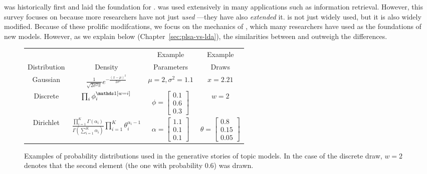\plsa{} was historically first and laid the foundation for .
\plsa{} was used extensively in many applications such as information
retrieval.  However, this survey focuses on  because more
researchers have not just \emph{used} ---they have also
\emph{extended} it.   is not just widely used, but it is also
widely modified.  Because of these prolific modifcations, we focus on the mechanics of , which many
researchers have used as the foundations of new models.  However, as
we explain below (Chapter~\ref{sec:plsa-vs-lda}), the similarities
between \plsa{} and  outweigh the differences.

\begin{figure}
\small
{}
  \begin{tabular}{cccc}
\hline
\rowcolor{gray!50}
 & & Example & Example \\
\rowcolor{gray!50}
    Distribution & Density & Parameters & Draws \\
    \hline \hline
    Gaussian  & $\frac{1}{\sqrt{2 \sigma^2 \pi}} e^{- \frac{(x-\mu)^2}{2 \sigma^2}}$ & $\mu=2, \sigma^2=1.1$ & $x=2.21$\\
    Discrete  & $\prod_i \phi_i^{\ind{w=i}}$ & $\phi=\begin{bmatrix}
           0.1 \\
           0.6 \\
           0.3 
         \end{bmatrix}$
                                                & $w=2$ \\
   Dirichlet & $\frac{\prod_{i=1}^K \Gamma(\alpha_i)}{\Gamma \left( \sum_{i=1}^K \alpha_i \right)} \prod_{i=1}^K \theta_i^{\alpha_i - 1} $ & $\alpha = \begin{bmatrix}
           1.1 \\
           0.1 \\
           0.1 
         \end{bmatrix}$  & $\theta = \begin{bmatrix}
           0.8 \\
           0.15 \\
           0.05 
         \end{bmatrix}$ \\
     \hline
  \end{tabular}
  \caption{Examples of probability distributions used in the
    generative stories of topic models.  In the case of the discrete
    draw, $w=2$ denotes that the second element (the one with
    probability $0.6$) was drawn.}
  \label{fig:distribution_examples}
\end{figure}

